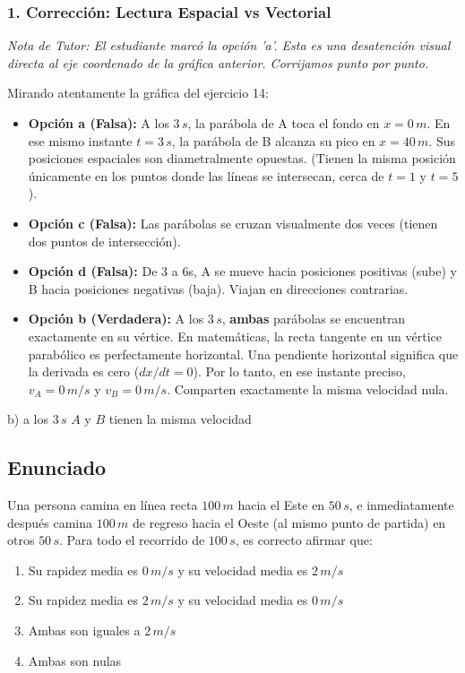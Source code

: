 \documentclass[12pt, a4paper]{article}
\begin{document}
\subsubsection*{1. Corrección: Lectura Espacial vs Vectorial}
\textit{Nota de Tutor: El estudiante marcó la opción 'a'. Esta es una desatención visual directa al eje coordenado de la gráfica anterior. Corrijamos punto por punto.}

Mirando atentamente la gráfica del ejercicio 14:
\begin{itemize}
    \item \textbf{Opción a (Falsa):} A los $3\,\si{s}$, la parábola de A toca el fondo en $x = 0\,\si{m}$. En ese mismo instante $t=3\,\si{s}$, la parábola de B alcanza su pico en $x = 40\,\si{m}$. Sus posiciones espaciales son diametralmente opuestas. (Tienen la misma posición únicamente en los puntos donde las líneas se intersecan, cerca de $t=1$ y $t=5$).
    \item \textbf{Opción c (Falsa):} Las parábolas se cruzan visualmente dos veces (tienen dos puntos de intersección).
    \item \textbf{Opción d (Falsa):} De 3 a 6s, A se mueve hacia posiciones positivas (sube) y B hacia posiciones negativas (baja). Viajan en direcciones contrarias.
    \item \textbf{Opción b (Verdadera):} A los $3\,\si{s}$, \textbf{ambas} parábolas se encuentran exactamente en su vértice. En matemáticas, la recta tangente en un vértice parabólico es perfectamente horizontal. Una pendiente horizontal significa que la derivada es cero ($dx/dt = 0$). Por lo tanto, en ese instante preciso, $v_A = 0\,\si{m/s}$ y $v_B = 0\,\si{m/s}$. Comparten exactamente la misma velocidad nula.
\end{itemize}

\begin{tcolorbox}[colback=green!5!white, colframe=green!50!black, title=Respuesta Final]
\centering \Large b) a los $3\,\si{s}$ $A$ y $B$ tienen la misma velocidad
\end{tcolorbox}

\newpage

\subsection*{Enunciado}
Una persona camina en línea recta $100\,\si{m}$ hacia el Este en $50\,\si{s}$, e inmediatamente después camina $100\,\si{m}$ de regreso hacia el Oeste (al mismo punto de partida) en otros $50\,\si{s}$. Para todo el recorrido de $100\,\si{s}$, es correcto afirmar que:
\begin{enumerate}[label=\alph*)]
    \item Su rapidez media es $0\,\si{m/s}$ y su velocidad media es $2\,\si{m/s}$
    \item Su rapidez media es $2\,\si{m/s}$ y su velocidad media es $0\,\si{m/s}$
    \item Ambas son iguales a $2\,\si{m/s}$
    \item Ambas son nulas
\end{enumerate}
\end{document}
